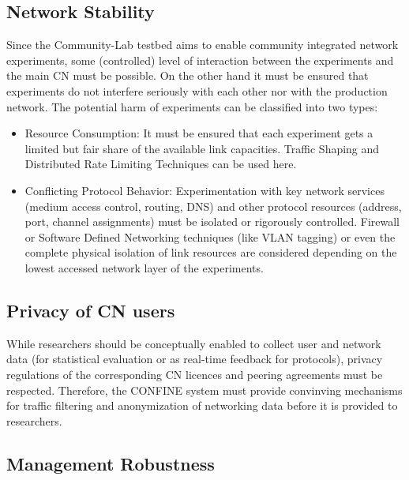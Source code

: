 \documentclass[conference]{IEEEtran}
\begin{document}
\subsection{Network Stability}
Since the Community-Lab testbed aims to enable community integrated network
experiments, some (controlled) level of interaction between the
experiments and the main CN must be possible. On the other hand it
must be ensured that experiments do not interfere seriously with each
other nor with the production network.  The potential harm of
experiments can be classified into two types:

\begin{itemize}

\item Resource Consumption: It must be ensured that each experiment
  gets a limited but fair share of the available link capacities.
  Traffic Shaping and Distributed Rate Limiting Techniques can be used
  here.

\item Conflicting Protocol Behavior: Experimentation with key network
  services (medium access control, routing, DNS) and other protocol
  resources (address, port, channel assignments) must be isolated or
  rigorously controlled.  Firewall or Software Defined Networking
  techniques (like VLAN tagging) or even the complete physical
  isolation of link resources are considered depending on the lowest
  accessed network layer of the experiments.

\end{itemize}

\subsection{Privacy of CN users}

While researchers should be conceptually enabled to collect user
and network data (for statistical evaluation or as real-time feedback
for protocols), privacy regulations of the corresponding CN licences
and peering agreements must be respected.
Therefore, the CONFINE system must provide convinving mechanisms for
traffic filtering and anonymization of networking data before it is
provided to researchers.

\subsection{Management Robustness}
\end{document}
